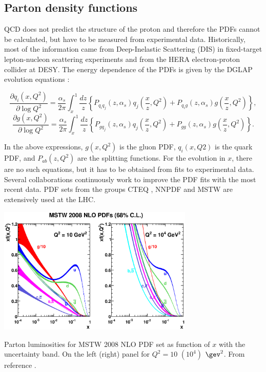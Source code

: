 \subsection{Parton density functions}
\label{chp:evtsim:evtgen:pdf}
QCD does not predict the structure of the proton and therefore the PDFs cannot be calculated, but have to be measured from experimental data. Historically, most of the information came from Deep-Inelastic Scattering (DIS) in fixed-target lepton-nucleon scattering experiments and from the HERA electron-proton collider at DESY. The energy dependence of the PDFs is given by the DGLAP evolution equations \cite{DGLAP1,DGLAP2,DGLAP3}:


\begin{equation}
\frac{\partial q_{i}(x,Q^{2})}{\partial \log Q^{2}}=\frac{\alpha_{s}}{2\pi} \int_x^1 \frac{dz}{z} \left \{ P_{q_{i}q_{j}}(z,\alpha_{s})q_{j}(\frac{x}{z},Q^{2}) + P_{q_{i}g}(z,\alpha_{s})g(\frac{x}{z},Q^{2})\right\},
\end{equation}
\begin{equation}
\frac{\partial g(x,Q^{2})}{\partial \log Q^{2}}=\frac{\alpha_{s}}{2\pi} \int_x^1 \frac{dz}{z} \left \{ P_{gq_{j}}(z,\alpha_{s})q_{j}(\frac{x}{z},Q^{2}) + P_{gg}(z,\alpha_{s})g(\frac{x}{z},Q^{2})\right\}.
\end{equation}

In the above expressions, $g(x,Q^{2})$ is the gluon PDF, $q_{i}(x,Q2)$ is the quark PDF, and $P_{ab}(z, Q^{2})$ are the splitting functions. 
For the evolution in $x$, there are no such equations, but it has to be obtained from fits to experimental data. Several collaborations continuously work to improve the PDF fits with the most recent data. PDF sets  from the groups CTEQ \cite{ct10}, NNPDF \cite{Ball:2012cx} and MSTW \cite{mstw1} are extensively used at the LHC.

\bfig[h!]
\centering
\includegraphics[width=0.7\textwidth]{figures/EvtGen/PDFplot.eps}
\captionsetup{width=0.85\textwidth} \caption{\small Parton luminosities for MSTW 2008 NLO PDF set as function of $x$ with the uncertainty band. On the left (right) panel for $Q^{2}=10$ $(10^{4})$ $\gev^{2}$. From reference \cite{mstw1}.}
\label{sec:evtgen:fig:pdf}
\efig


